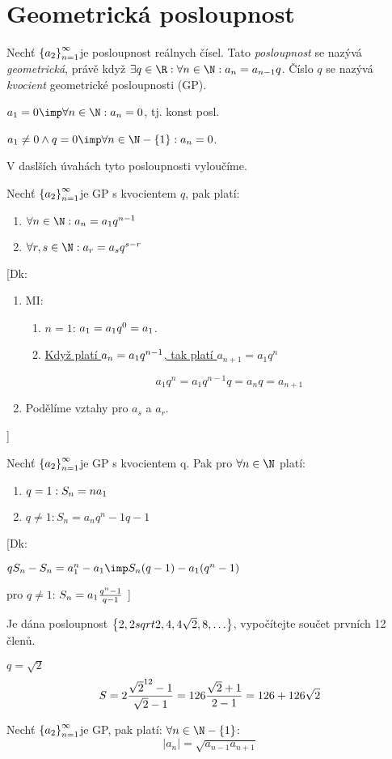 
\BeginDoc{}
\def\posloup{$\zs{a_2}_{n=1}^{\infty}$}
\section{Geometrická posloupnost}
\Def Nechť \posloup je posloupnost reálnych čísel.
Tato \emph{posloupnost} se nazývá \emph{geometrická}, právě když $\exists q\in \R: \forall n\in\N: a_n=a_{n-1}q$. Číslo $q$  se nazývá \emph{kvocient} geometrické posloupnosti (GP).


\Pozenum
$a_1=0 \imp \forall n\in\N:a_n=0 $, tj. konst posl.
\item $a_1\neq 0\land q=0 \imp \forall n\in\N-\zs{1}:a_n=0 $.
\End

\Poz
V daslších úvahách tyto posloupnosti vyloučíme.

\V
Nechť \posloup je GP s kvocientem $q$, pak platí:
\begin{enumerate}
	\item $\forall n \in \N : a_n = a_1 \*q^{n-1}$
	\item $\forall r,s \in \N : a_r = a_s \*q^{s-r}$
\end{enumerate}

[Dk:
\begin{enumerate}
	\item MI:
		\begin{enumerate}
			\item $n=1$: $a_1 = a_1 \*q^0 = a_1$.
			\item \underline{Když platí $a_n = a_1 \* q^{n-1}$, tak platí $a_{n+1}=a_1q^n$}

				$$a_1q^{n} = a_1q^{n-1}q=a_{n}q=a_{n+1}$$
		\end{enumerate}
	\item Podělíme vztahy pro $a_s$ a $a_r$.

\end{enumerate}
]


\V Nechť \posloup je GP s kvocientem q. Pak pro $\forall n \in \N$ platí:
\begin{enumerate}
	\item $q=1: S_n = n\*a_1$
	\item $q\neq1: S_n = a_n {q^n-1}{q-1}$
\end{enumerate}

[Dk: 

$qS_n - S_n = a_1^n -a_1 \imp S_n (q-1) - a_1 (q^n-1)$ 

pro $q\neq 1$: $S_n = a_1 \frac{q^n-1}{q-1}$
]

\Pr Je dána posloupnost $\left\{{2,2 sqrt 2,4,4\sqrt 2, 8,\dots}\right\}$, vypočítejte součet prvních 12 členů.

$q=\sqrt 2$
$$ S = 2 \frac{\sqrt{2}^{12}-1}{\sqrt 2 -1} = 126 \frac{\sqrt 2 + 1}{2-1} = 126 + 126 \sqrt 2$$

\V Nechť \posloup je GP, pak platí: $\forall n\in\N-\zs{1}$:
$$|a_n| = \sqrt{a_{n-1}a_{n+1}}$$




\EndDoc
